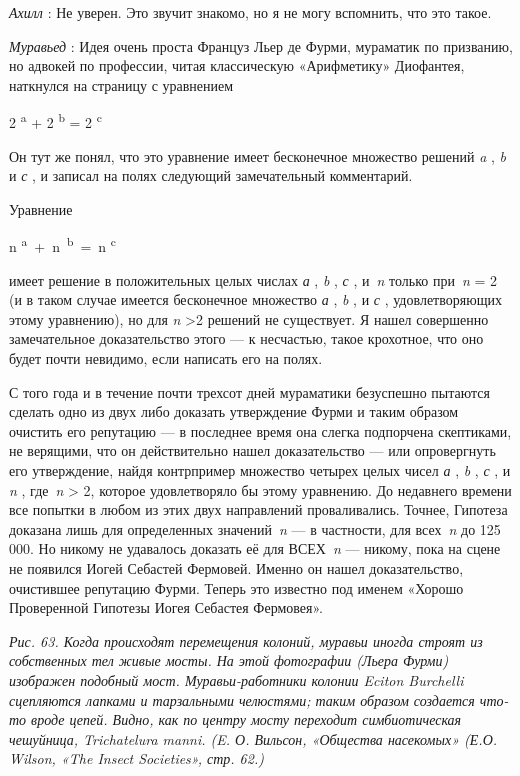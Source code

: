 \documentclass[../main.tex]{subfiles}
\begin{document}
\begin{dialogue}
\emph{Ахилл} : Не уверен. Это звучит знакомо, но я не могу вспомнить, что это такое.

\emph{Муравьед} : Идея очень проста Француз Льер де Фурми, мураматик по призванию, но адвокей по профессии, читая классическую «Арифметику» Диофантея, наткнулся на страницу с уравнением

2 \textsuperscript{a} + 2 \textsuperscript{b} = 2 \textsuperscript{c}

Он тут же понял, что это уравнение имеет бесконечное множество решений \emph{a} , \emph{b} и \emph{с} , и записал на полях следующий замечательный комментарий.

Уравнение

n \textsuperscript{a}~+~n~\textsuperscript{b}~=~n \textsuperscript{c}

имеет решение в положительных целых числах \emph{а} , \emph{b} , \emph{с} , и~\emph{n} только при~\emph{n} = 2 (и в таком случае имеется бесконечное множество \emph{а} , \emph{b} , и \emph{с} , удовлетворяющих этому уравнению), но для \emph{n} \textgreater2 решений не существует. Я нашел совершенно замечательное доказательство этого --- к несчастью, такое крохотное, что оно будет почти невидимо, если написать его на полях.

С того года и в течение почти трехсот дней мураматики безуспешно пытаются сделать одно из двух либо доказать утверждение Фурми и таким образом очистить его репутацию --- в последнее время она слегка подпорчена скептиками, не верящими, что он действительно нашел доказательство --- или опровергнуть его утверждение, найдя контрпример множество четырех целых чисел \emph{а} , \emph{b} , \emph{с} , и \emph{n} , где~\emph{n} \textgreater{} 2, которое удовлетворяло бы этому уравнению. До недавнего времени все попытки в любом из этих двух направлений проваливались. Точнее, Гипотеза доказана лишь для определенных значений~\emph{n} --- в частности, для всех~\emph{n} до 125 000. Но никому не удавалось доказать её для ВСЕХ~\emph{n} --- никому, пока на сцене не появился Иогей Себастей Фермовей. Именно он нашел доказательство, очистившее репутацию Фурми. Теперь это известно под именем «Хорошо Проверенной Гипотезы Иогея Себастея Фермовея».

\emph{Рис. 63. Когда происходят перемещения колоний, муравьи иногда строят из собственных тел живые мосты. На этой фотографии (Льера Фурми) изображен подобный мост. Муравьи-работники колонии Eciton Burchelli сцепляются лапками и тарзальными челюстями; таким образом создается что-то вроде цепей. Видно, как по центру мосту переходит симбиотическая чешуйница, Trichatelura manni. (E. О. Вильсон, «Общества насекомых» (Е.О. Wilson, «The Insect Societies», стр. 62.)}


\end{dialogue}
\end{document}
